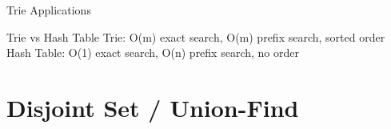 \documentclass[aspectratio=169,xcolor=dvipsnames]{beamer}
\begin{document}
\begin{frame}{Trie Applications}
  \vspace{0.3cm}

  \begin{alertblock}{Trie vs Hash Table}
    Trie: O(m) exact search, O(m) prefix search, sorted order \\
    Hash Table: O(1) exact search, O(n) prefix search, no order
  \end{alertblock}
\end{frame}

\section{Disjoint Set / Union-Find}
\end{document}
